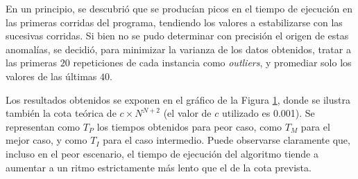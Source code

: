             En un principio, se descubrió que se producían picos en el tiempo de ejecución en las primeras corridas del programa, tendiendo los valores a estabilizarse con las sucesivas corridas. Si bien no se pudo determinar con precisión el origen de estas anomalías, se decidió, para minimizar la varianza de los datos obtenidos, tratar a las primeras $20$ repeticiones de cada instancia como \emph{outliers}, y promediar solo los valores de las últimas $40$.

            \renewcommand\constante{0.001}

            Los resultados obtenidos se exponen en el gráfico de la Figura \ref{fig:exp3:part_tiempo_base}, donde se ilustra también la cota teórica de $c \times N^{N + 2}$ (el valor de $c$ utilizado es \constante). Se representan como $T_P$ los tiempos obtenidos para peor caso, como $T_M$ para el mejor caso, y como $T_I$ para el caso intermedio. Puede observarse claramente que, incluso en el peor escenario, el tiempo de ejecución del algoritmo tiende a aumentar a un ritmo estrictamente más lento que el de la cota prevista.

            \begin{figure}[H]
                \centering
                \caption{}
                \label{fig:exp3:part_tiempo_base}
            \end{figure}

